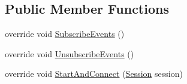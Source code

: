 \subsection*{Public Member Functions}
\begin{DoxyCompactItemize}
\item 
override void \hyperlink{class_skyrates_1_1_client_1_1_network_1_1_client_a23c86b069c7a1178e002e5a0a5196ca7}{Subscribe\-Events} ()
\item 
override void \hyperlink{class_skyrates_1_1_client_1_1_network_1_1_client_a5c782a9a4d92befaaf7ad3e2842eaae6}{Unsubscribe\-Events} ()
\item 
\hypertarget{class_skyrates_1_1_client_1_1_network_1_1_client_a7486bac40ef938a4580ad657f1d26276}{override void \hyperlink{class_skyrates_1_1_client_1_1_network_1_1_client_a7486bac40ef938a4580ad657f1d26276}{Start\-And\-Connect} (\hyperlink{class_skyrates_1_1_common_1_1_network_1_1_session}{Session} session)}\label{class_skyrates_1_1_client_1_1_network_1_1_client_a7486bac40ef938a4580ad657f1d26276}


\end{DoxyCompactItemize}
